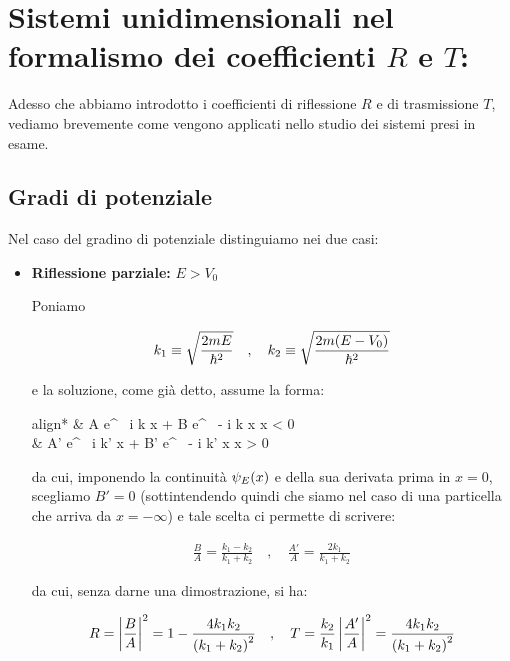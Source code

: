 \section{Sistemi unidimensionali nel formalismo dei coefficienti $R$ e $T$:}

	Adesso che abbiamo introdotto i coefficienti di riflessione $R$ e di trasmissione $T$, vediamo brevemente come vengono applicati nello studio dei sistemi presi in esame.
	
\subsection{Gradi di potenziale} 
	
	Nel caso del gradino di potenziale distinguiamo nei due casi:
	
\begin{itemize}
	\item \textbf{Riflessione parziale:} $E > V_0$
	
		Poniamo
		
	\begin{align*}
		k_1 \equiv \sqrt{\frac{2mE}{\hbar^2}} \quad , \quad k_2 \equiv \sqrt{\frac{2m\qty(E-V_0)}{\hbar^2}}
	\end{align*}
		
		e la soluzione, come già detto, assume la forma:
		
	\begin{empheq}[left={\psi_E \qty(x)=\empheqlbrace}]{align*}
		& A e^{ \, i k x} + B e^{ \, - i k x} \quad {} \quad x < 0 \\
  		& A' e^{ \, i k' x} + B' e^{ \, - i k' x} \quad {} \quad x > 0
	\end{empheq}
	
		da cui, imponendo la continuità $\psi_E\qty(x)$ e della sua derivata prima in $x = 0$, scegliamo $B' = 0$ (sottintendendo quindi che siamo nel caso di una particella che arriva da $x = - \infty$) e tale scelta ci permette di scrivere:
		
	\begin{align*}
		\frac{B}{A} = \frac{k_1 - k_2}{k_1 + k_2} \quad , \quad \frac{A'}{A} = \frac{2 k_1}{k_1 + k_2}
	\end{align*}
		
		da cui, senza darne una dimostrazione, si ha:
		
	\begin{align*}
		R = \qty|\frac{B}{A}|^2 = 1 - \frac{4 k_1 k_2}{\qty(k_1 + k_2)^2} \quad , \quad T = \frac{k_2}{k_1} \, \qty|\frac{A'}{A}|^2 = \frac{4 k_1 k_2}{\qty(k_1 + k_2)^2}
	\end{align*}


\end{itemize}
